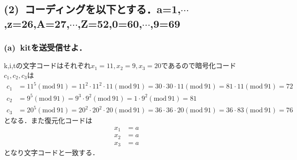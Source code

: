 \documentclass[a4paper,12pt]{jarticle}
\begin{document}
\subsection*{(2)~コーディングを以下とする．a=1,$\cdots$,z=26,A=27,$\cdots$,Z=52,0=60,$\cdots$,9=69}
\subsubsection*{(a)~kitを送受信せよ．}
\vspace{-5mm}
k,i,tの文字コードはそれぞれ$x_1=11,x_2=9,x_3=20$であるので暗号化コード
$c_1,c_2,c_3$は
%
\begin{align*}
 c_1&=11^5(\mathrm{mod}~91)=11^2\cdot11^2\cdot11(\mathrm{mod}~91)=30\cdot30\cdot11(\mathrm{mod}~91)=81\cdot11(\mathrm{mod}~91)=72\\
 c_2&=9^5(\mathrm{mod}~91)=9^3\cdot9^2(\mathrm{mod}~91)=1\cdot9^2(\mathrm{mod}~91)=81\\
 c_3&=20^5(\mathrm{mod}~91)=20^2\cdot20^2\cdot20(\mathrm{mod}~91)=36\cdot36\cdot20(\mathrm{mod}~91)=36\cdot83(\mathrm{mod}~91)=76
\end{align*}
%
となる．また復元化コードは
%
\begin{align*}
 x_1&=a\\
 x_2&=a\\
 x_3&=a
\end{align*}
%
となり文字コードと一致する．
\end{document}
